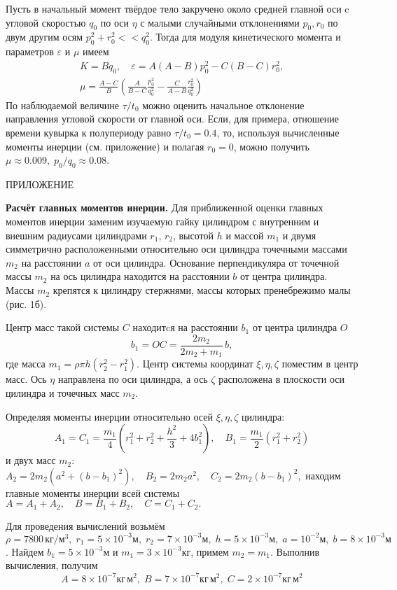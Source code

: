 \documentclass[14pt,a4paper]{extarticle}
\def\DS{\displaystyle}
\def\eps{\varepsilon}
\begin{document}
Пусть в начальный момент твёрдое тело закручено около средней главной оси c угловой скоростью $q_0$ по оси $\eta$ с малыми случайными отклонениями $p_0, r_0$  по двум другим осям  $p_0^2+r_0^2<<q_0^2$. Тогда для модуля кинетического момента и параметров $\eps$ и $\mu$ имеем
$$
\begin{array}{c}
\DS K=Bq_{0},\quad \eps =A\left( A-B\right) p_{0}^{2}-C\left( B-C\right)
r_{0}^{2},\\[2ex]
\DS \mu = \frac{A-C}{B}\left(\frac{A}{B-C}\frac{p_0^2}{q_0^2}-\frac{C}{A-B}\frac{r_0^2}{q_0^2}\right)
\end{array}
$$
По наблюдаемой величине $\tau/t_0$ можно оценить начальное отклонение направления угловой скорости от главной оси.  Если, для примера, отношение времени кувырка к полупериоду равно $\tau/t_0=0.4$, то, используя вычисленные моменты инерции (см. приложение) и полагая $r_0=0$, можно получить $\mu\approx 0.009,\;{p_0}/{q_0}\approx 0.08$.


\bigskip


ПРИЛОЖЕНИЕ

{\bf Расчёт главных моментов инерции.} Для приближенной оценки главных моментов инерции заменим изучаемую гайку цилиндром с внутренним и внешним радиусами цилиндрами $r_1,\,r_2$, высотой $h$ и массой $m_1$ и двумя симметрично расположенными относительно оси цилиндра точечными массами $m_2$ на расстоянии $a$ от оси цилиндра. Основание перпендикуляра от точечной массы $m_2$ на ось цилиндра находится на расстоянии $b$ от центра цилиндра. Массы $m_2$ крепятся к цилиндру стержнями, массы которых пренебрежимо малы (рис. 1б).

Центр масс такой системы $C$ находитcя на расстоянии $b_1$ от центра цилиндра $O$
$$
b_1=OC=\frac{2m_2}{2m_2+m_1}\,b,
$$
где масса $m_1=\rho\pi h(r_2^2-r_1^2).$
Центр системы координат $\xi,\eta,\zeta$ поместим в центр масс. Ось $\eta$ направлена по оси цилиндра, а ось $\zeta$ расположена в плоскости  оси цилиндра и точечных масс $m_2$.

Определяя моменты инерции относительно осей $\xi,\eta,\zeta$ цилиндра:
$$
A_1=C_1=\frac{m_1}{4}(r_1^2+r_2^2+\frac{h^2}{3}+4b_1^2),\quad B_1=\frac{m_1}{2}(r_1^2+r_2^2)
$$
и двух масс $m_2$: $
A_2=2m_2\left(a^2+(b-b_1)^2\right),\quad B_2=2m_2a^2,\quad C_2=2m_2(b-b_1)^2,
$
находим главные моменты инерции всей системы
$
A=A_1+A_2,\quad B=B_1+B_2,\quad C=C_1+C_2.
$

Для проведения вычислений возьмём $\rho=7800\, кг/м^3,\;r_1=5\times 10^{-3}м,\;r_2=7\times 10^{-3}м,\;h=5\times 10^{-3}м,\;a=10^{-2}м,\;b=8\times 10^{-3}м$. Найдем $b_1=5\times 10^{-3}м$ и $m_1=3\times 10^{-3}кг$, примем $m_2=m_1$.\newline
Выполнив вычисления, получим
$$A=8\times 10^{-7}кг\,м^2,\;B=7\times 10^{-7}кг\,м^2,\;C=2\times 10^{-7}кг\,м^2$$
\end{document}
